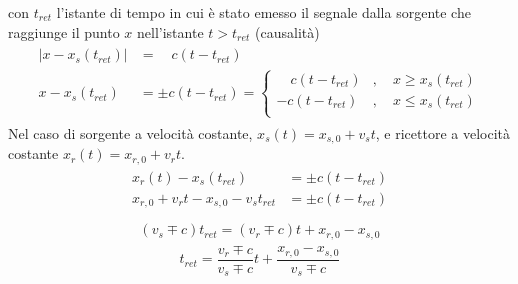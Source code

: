 \documentclass[letterpaper,10pt,italian]{jupyterBook}
\begin{document}
\sphinxAtStartPar
con \(t_{ret}\) l’istante di tempo in cui è stato emesso il segnale dalla sorgente che raggiunge il punto \(x\) nell’istante \(t > t_{ret}\) (causalità)
\begin{equation*}
\begin{split}\begin{aligned}
 | x - x_s(t_{ret}) | & = \quad  c (t - t_{ret}) \\
   x - x_s(t_{ret})   & = \pm c (t - t_{ret}) = \begin{cases} \quad c ( t-t_{ret} ) & , \quad x \ge x_s(t_{ret}) \\ - c ( t-t_{ret} ) & , \quad  x \le x_s(t_{ret}) \\ \end{cases}
\end{aligned}\end{split}
\end{equation*}
\sphinxAtStartPar
Nel caso di sorgente a velocità costante, \(x_s(t) = x_{s,0} + v_s t\), e ricettore a velocità costante \(x_r(t) = x_{r,0} + v_r t\).
\begin{equation*}
\begin{split}\begin{aligned}
  x_r(t) -x_s(t_{ret}) & = \pm c ( t - t_{ret} ) \\
  x_{r,0} + v_r t - x_{s,0} - v_s t_{ret} & = \pm c ( t - t_{ret} ) \\
\end{aligned}\end{split}
\end{equation*}\begin{equation*}
\begin{split}(v_s \mp c) t_{ret} = (v_r \mp c) t + x_{r,0} - x_{s,0}\end{split}
\end{equation*}\begin{equation*}
\begin{split}t_{ret} = \dfrac{v_r \mp c}{v_s \mp c} t + \dfrac{x_{r,0} - x_{s,0}}{v_s \mp c}\end{split}
\end{equation*}
\end{document}
